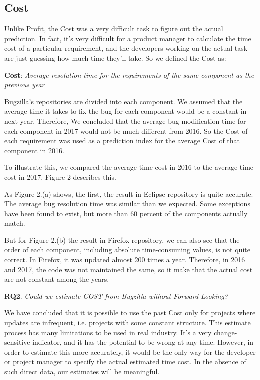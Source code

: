 \subsection{Cost}

 Unlike Profit, the Cost was a very difficult task to figure out the actual prediction. In fact, it's very difficult for a product manager to calculate the time cost of a particular requirement, and the developers working on the actual task are just guessing how much time they'll take. 
 So we defined the Cost as: 
 
\textbf{Cost}: \textit{Average resolution time for the requirements of the same component as the previous year}

Bugzilla's repositories are divided into each component. We assumed that the average time it takes to fix the bug for each component would be a constant in next year. Therefore, We concluded that the average bug modification time for each component in 2017 would not be much different from 2016. So the Cost of each requirement was used as a prediction index for the average Cost of that component in 2016.

 To illustrate this, we compared the average time cost in 2016 to the average time cost in 2017. Figure 2 describes this.
 
As Figure 2.(a) shows, the first, the result in Eclipse repository is quite accurate. The average bug resolution time was similar than we expected. Some exceptions have been found to exist, but more than 60 percent of the components actually match.

But for Figure 2.(b) the result in Firefox repository, we can also see that the order of each component, including absolute time-consuming values, is not quite correct. In Firefox, it was updated almost 200 times a year. Therefore, in 2016 and 2017, the code was not maintained the same, so it make that the actual cost are not constant among the years. 

\textbf{RQ2}. \textit{Could we estimate COST from Bugzilla without Forward Looking?}

We have concluded that it is possible to use the past Cost only for projects where updates are infrequent, i.e. projects with some constant structure. This estimate process has many limitations to be used in real industry. It's a very change-sensitive indicator, and it has the potential to be wrong at any time. However, in order to estimate this more accurately, it would be the only way for the developer or project manager to specify the actual estimated time cost. In the absence of such direct data, our estimates will be meaningful.


